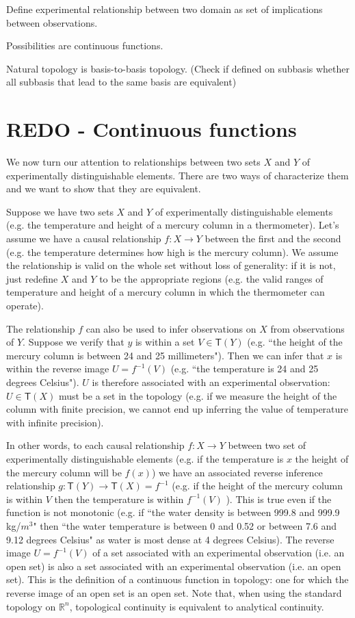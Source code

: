 \documentclass[11pt,letterpaper,fleqn]{memoir} %
\begin{document}
Define experimental relationship between two domain as set of implications between observations.

Possibilities are continuous functions.

Natural topology is basis-to-basis topology. (Check if defined on subbasis whether all subbasis that lead to the same basis are equivalent)

\section{REDO - Continuous functions}

We now turn our attention to relationships between two sets $X$ and $Y$ of experimentally distinguishable elements. There are two ways of characterize them and we want to show that they are equivalent.

Suppose we have two sets $X$ and $Y$ of experimentally distinguishable elements (e.g. the temperature and height of a mercury column in a thermometer). Let's assume we have a causal relationship $f: X \rightarrow Y$ between the first and the second (e.g. the temperature determines how high is the mercury column). We assume the relationship is valid on the whole set without loss of generality: if it is not, just redefine $X$ and $Y$ to be the appropriate regions (e.g. the valid ranges of temperature and height of a mercury column in which the thermometer can operate).

The relationship $f$ can also be used to infer observations on $X$ from observations of $Y$. Suppose we verify that $y$ is within a set $V \in \mathsf{T}(Y)$ (e.g. ``the height of the mercury column is between 24 and 25 millimeters"). Then we can infer that $x$ is within the reverse image $U=f^{-1}(V)$ (e.g. ``the temperature is 24 and 25 degrees Celsius"). $U$ is therefore associated with an experimental observation: $U \in \mathsf{T}(X)$ must be a set in the topology (e.g. if we measure the height of the column with finite precision, we cannot end up inferring the value of temperature with infinite precision).

In other words, to each causal relationship $f: X \rightarrow Y$ between two set of experimentally distinguishable elements (e.g. if the temperature is $x$ the height of the mercury column will be $f(x)$) we have an associated reverse inference relationship $g  : \mathsf{T}(Y) \rightarrow \mathsf{T}(X) = f^{-1}$ (e.g. if the height of the mercury column is within $V$ then the temperature is within $f^{-1}(V)$ ). This is true even if the function is not monotonic (e.g. if ``the water density is between 999.8 and 999.9 kg/$m^3$" then ``the water temperature is between 0 and 0.52 or between 7.6 and 9.12 degrees Celsius" as water is most dense at 4 degrees Celsius).  The reverse image $U=f^{-1}(V)$ of a set associated with an experimental observation (i.e. an open set) is also a set associated with an experimental observation (i.e. an open set). This is the definition of a continuous function in topology: one for which the reverse image of an open set is an open set. Note that, when using the standard topology on $\mathbb{R}^n$, topological continuity is equivalent to analytical continuity.
\end{document}
